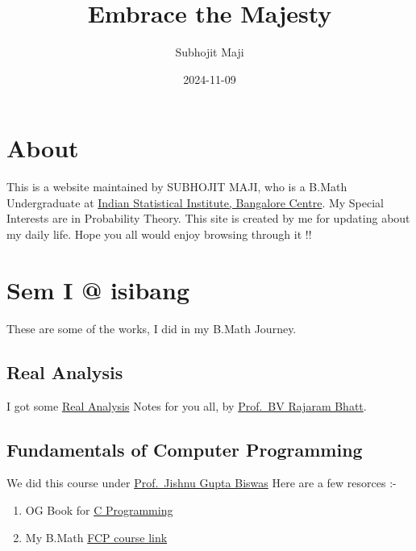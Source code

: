 \documentclass[
  letterpaper,
  DIV=11,
  numbers=noendperiod]{scrreprt}
\title{Embrace the Majesty}
\author{Subhojit Maji}
\date{2024-11-09}
\providecommand{\tightlist}{%
  \setlength{\itemsep}{0pt}\setlength{\parskip}{0pt}}\usepackage{longtable,booktabs,array}
\renewcommand*\contentsname{Table of contents}
\newcommand\contentsname{Table of contents}
\begin{document}
\maketitle

\renewcommand*\contentsname{Table of contents}
{
\hypersetup{linkcolor=}
\setcounter{tocdepth}{2}
\tableofcontents
}


\chapter{About}\label{about}

This is a website maintained by SUBHOJIT MAJI, who is a B.Math
Undergraduate at \href{https://www.isibang.ac.in/}{Indian Statistical
Institute, Bangalore Centre}. My Special Interests are in Probability
Theory. This site is created by me for updating about my daily life.
Hope you all would enjoy browsing through it !!


\chapter{Sem I @ isibang}\label{sem-i-isibang}

These are some of the works, I did in my B.Math Journey.

\section{Real Analysis}\label{real-analysis}

I got some
\href{https://drive.google.com/file/d/15aQW5bT4oBRqTgWve05l_CL1jxj97ieQ/view?usp=sharing}{Real
Analysis} Notes for you all, by
\href{https://www.isibang.ac.in/~bhat/}{Prof.~BV Rajaram Bhatt}.

\section{Fundamentals of Computer
Programming}\label{fundamentals-of-computer-programming}

We did this course under
\href{https://isi.irins.org/profile/13204}{Prof.~Jishnu Gupta Biswas}
Here are a few resorces :-

\begin{enumerate}
\def\labelenumi{\arabic{enumi}.}
\tightlist
\item
  OG Book for
  \href{https://drive.google.com/file/d/1JgIz5I723BBlrkGD4n0qE4n5U89LD3XY/view?usp=sharing}{C
  Programming}
\item
  My B.Math
  \href{https://www.isibang.ac.in/~adean/infsys/database/Bmath/FCP.html}{FCP
  course link}
\end{enumerate}
\end{document}
